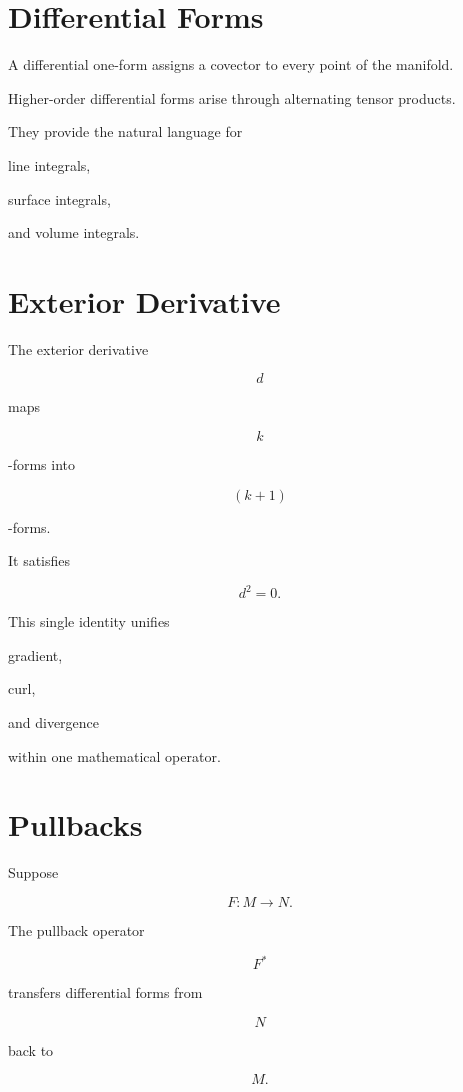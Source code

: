 \documentclass[11pt,fleqn]{book}
\numberwithin{equation}{chapter}
\theoremstyle{plain}
\theoremstyle{definition}
\theoremstyle{remark}
\begin{document}
\section{Differential Forms}

A differential one-form assigns a covector to every point of the
manifold.

Higher-order differential forms arise through alternating tensor
products.

They provide the natural language for

line integrals,

surface integrals,

and volume integrals.


\section{Exterior Derivative}

The exterior derivative

\[
d
\]

maps

\[
k
\]

-forms into

\[
(k+1)
\]

-forms.

It satisfies

\[
\boxed{
d^2=0.
}
\]

This single identity unifies

gradient,

curl,

and divergence

within one mathematical operator.


\section{Pullbacks}

Suppose

\[
F:M\rightarrow N.
\]

The pullback operator

\[
F^*
\]

transfers differential forms from

\[
N
\]

back to

\[
M.
\]
\end{document}
